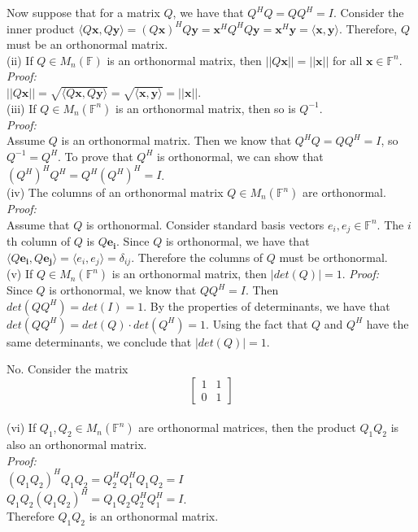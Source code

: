 \documentclass[letterpaper,12pt]{article}
\let\vec\mathbf
\theoremstyle{definition}
\begin{document}
Now suppose that for a matrix $Q$, we have that $Q^HQ = QQ^H = I$. Consider the inner product $\langle Q\vec{x},  Q\vec{y} \rangle = (Q\vec{x})^HQ\vec{y} = \vec{x}^HQ^HQ\vec{y} = \vec{x}^H\vec{y} = \langle \vec{x}, \vec{y} \rangle$. Therefore, $Q$ must be an orthonormal matrix. \\

(ii) If $Q \in M_n(\mathbb{F})$ is an orthonormal matrix, then $||Q\vec{x}|| = ||\vec{x}||$ for all $\vec{x} \in \mathbb{F}^n$. \\
\textit{Proof:} \\
$||Q\vec{x}|| = \sqrt{\langle Q\vec{x},  Q\vec{y} \rangle} = \sqrt{\langle \vec{x},  \vec{y} \rangle} = ||\vec{x}||$. \\

(iii) If $Q \in M_n(\mathbb{F}^n)$ is an orthonormal matrix, then so is $Q^{-1}$. \\
\textit{Proof:} \\
Assume $Q$ is an orthonormal matrix. Then we know that $Q^HQ=QQ^H=I$, so $Q^{-1} = Q^H$. To prove that $Q^H$ is orthonormal, we can show that $(Q^H)^H Q^H = Q^H (Q^H)^H = I$. \\

(iv) The columns of an orthonormal matrix $Q \in M_n(\mathbb{F}^n)$ are orthonormal. \\
\textit{Proof:} \\
Assume that $Q$ is orthonormal. Consider standard basis vectors $e_i, e_j \in \mathbb{F}^n$. The $i$th column of $Q$ is $Q \vec{e_i}$. Since $Q$ is orthonormal, we have that $\langle Q \vec{e_i}, Q \vec{e_j} \rangle = \langle e_i, e_j \rangle = \delta_{ij}$. Therefore the columns of $Q$ must be orthonormal. \\

(v) If $Q \in M_n(\mathbb{F}^n)$ is an orthonormal matrix, then $|det(Q)| = 1$.
\textit{Proof:} \\
Since $Q$ is orthonormal, we know that $QQ^H = I$. Then $det(QQ^H) = det(I) = 1$. By the properties of determinants, we have that $det(QQ^H) = det(Q) \cdot det(Q^H) = 1$. Using the fact that $Q$ and $Q^H$ have the same determinants, we conclude that $|det(Q)| = 1$.

No. Consider the matrix
\[
\begin{bmatrix}
  1 & 1 \\
  0 & 1
\end{bmatrix}
\] \\

(vi) If $Q_1, Q_2 \in M_n(\mathbb{F}^n)$ are orthonormal matrices, then the product $Q_1Q_2$ is also an orthonormal matrix. \\
\textit{Proof:} \\
$(Q_1Q_2)^HQ_1Q_2 = Q_2^H Q_1^H Q_1 Q_2 = I$ \\
$Q_1Q_2(Q_1Q_2)^H = Q_1 Q_2 Q_2^H Q_1^H = I$. \\
Therefore $Q_1Q_2$ is an orthonormal matrix. \\
\end{document}
